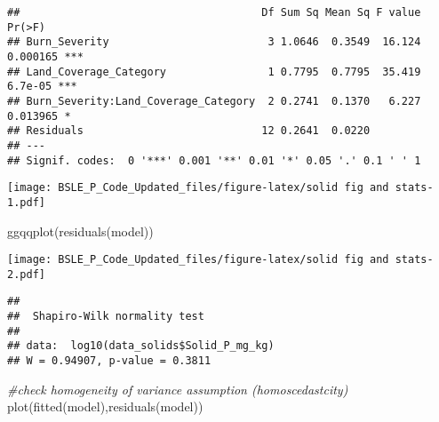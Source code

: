 \documentclass[
]{article}
\newenvironment{Shaded}{\begin{snugshade}}{\end{snugshade}}
\newcommand{\CommentTok}[1]{\textcolor[rgb]{0.56,0.35,0.01}{\textit{#1}}}
\newcommand{\FunctionTok}[1]{\textcolor[rgb]{0.00,0.00,0.00}{#1}}
\newcommand{\NormalTok}[1]{#1}
\newcommand{\SpecialCharTok}[1]{\textcolor[rgb]{0.00,0.00,0.00}{#1}}
\begin{document}
\begin{verbatim}
##                                      Df Sum Sq Mean Sq F value   Pr(>F)    
## Burn_Severity                         3 1.0646  0.3549  16.124 0.000165 ***
## Land_Coverage_Category                1 0.7795  0.7795  35.419  6.7e-05 ***
## Burn_Severity:Land_Coverage_Category  2 0.2741  0.1370   6.227 0.013965 *  
## Residuals                            12 0.2641  0.0220                     
## ---
## Signif. codes:  0 '***' 0.001 '**' 0.01 '*' 0.05 '.' 0.1 ' ' 1
\end{verbatim}

\begin{Shaded}
\end{Shaded}

\texttt{[image: BSLE\_P\_Code\_Updated\_files/figure-latex/solid fig and stats-1.pdf]}

\begin{Shaded}
\begin{Highlighting}[]
\FunctionTok{ggqqplot}\NormalTok{(}\FunctionTok{residuals}\NormalTok{(model))}
\end{Highlighting}
\end{Shaded}

\texttt{[image: BSLE\_P\_Code\_Updated\_files/figure-latex/solid fig and stats-2.pdf]}

\begin{Shaded}
\end{Shaded}

\begin{verbatim}
## 
##  Shapiro-Wilk normality test
## 
## data:  log10(data_solids$Solid_P_mg_kg)
## W = 0.94907, p-value = 0.3811
\end{verbatim}

\begin{Shaded}
\begin{Highlighting}[]
\CommentTok{\#check homogeneity of variance assumption (homoscedastcity)}
\FunctionTok{plot}\NormalTok{(}\FunctionTok{fitted}\NormalTok{(model),}\FunctionTok{residuals}\NormalTok{(model))}
\end{Highlighting}
\end{Shaded}
\end{document}
